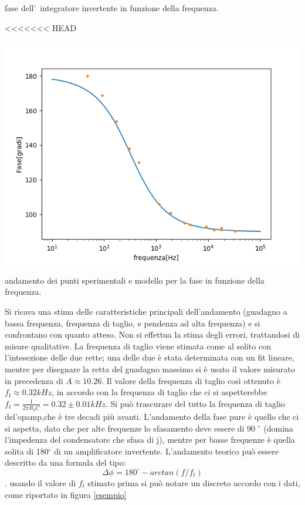 \documentclass[10pt,a4paper]{article}
\begin{document}
\begin{table}[h]
		\caption{ fase dell'~integratore invertente in funzione della frequenza.}
		\label{tab:bodefase}
		\begin{center}
<<<<<<< HEAD
		
	\includegraphics[scale=0.5]{esempio.png}

		\end{center}
		\caption{\small andamento dei punti sperimentali e modello per la fase in funzione della frequenza.}
		
		\label{esempio}


	
	Si ricava una stima delle caratteristiche principali dell'andamento (guadagno a bassa frequenza, frequenza di taglio, e pendenza ad alta frequenza)
	e si confrontano con quanto atteso. Non si effettua la stima degli errori, trattandosi di misure qualitative.
	La frequenza di taglio viene stimata come al solito con l'intesezione delle due rette; una delle due è stata determinata con un fit lineare, mentre per disegnare la retta del guadagno massimo si è usato il valore misurato in precedenza di $A\approx10.26$. Il valore della frequenza di taglio così ottenuto è $f_t\approx0.32 kHz$, in accordo con la frequenza di taglio che ci si aspetterebbe $f_t=\frac{1}{2\pi R_2C}=0.32\pm0.01 kHz$. Si può trascurare del tutto la frequenza di taglio del'opamp,che è tre decadi più avanti.
	L'andamento della fase pure è quello che ci si aspetta, dato che per alte frequenze lo sfasamento deve essere di 90 $^{\circ}$ (domina l'impedenza del condensatore che sfasa di j), mentre per basse frequenze è quella solita di 180$^{\circ}$ di un amplificatore invertente. L'andamento teorico può essere descritto da una formula del tipo:\[\Delta\phi=180^{\circ}-arctan(f/f_t)\]. usando il valore di $f_t$ stimato prima si può notare un discreto accordo con i dati, come riportato in figura \ref{esempio}
	

\end{table}
\end{document}
